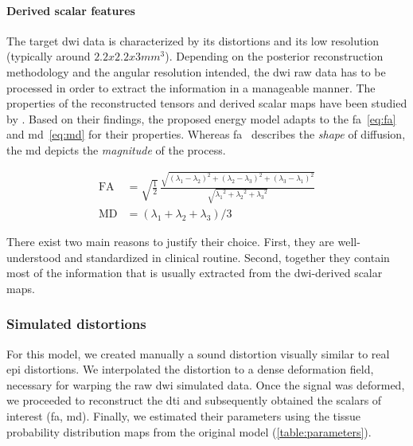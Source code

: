 \paragraph{Derived scalar features}
The target \ac{dwi} data is characterized by its distortions and its
low resolution (typically around $2.2x2.2x3mm^3$). Depending on the
posterior reconstruction methodology and the angular resolution
intended, the \ac{dwi} raw data has to be processed in order to
extract the information in a manageable manner. The properties of
the reconstructed tensors and derived scalar maps have been
studied by \cite{ennis_orthogonal_2006}. Based on their
findings, the proposed energy model adapts to the \ac{fa}~\eqref{eq:fa} 
and \ac{md}~\eqref{eq:md} for their properties. 
Whereas \ac{fa} \ describes the \emph{shape} of diffusion, 
the \ac{md} depicts the \emph{magnitude} of the process. 

\begin{align}
\mathrm{FA} &= \sqrt{ \frac{1}{2}}\,\frac{\sqrt{ (\lambda_1 - \lambda_2)^2 + (\lambda_2 - \lambda_3)^2 + (\lambda_3 - \lambda_1)^2}}{\sqrt{ {\lambda_1}^2 + {\lambda_2}^2 + {\lambda_3}^2}} \label{eq:fa} \\
\mathrm{MD} &= ( \lambda_1 + \lambda_2 + \lambda_3 ) / 3 \label{eq:md}
\end{align}

There exist two main reasons to justify their choice. 
First, they are well-understood and standardized in clinical routine.
Second, together they contain most of the information that is
usually extracted from the \ac{dwi}-derived scalar maps. \\

\subsubsection{Simulated distortions}

For this model, we created manually a sound distortion visually similar
to real \ac{epi} distortions. We interpolated the distortion to a 
dense deformation field, necessary for warping the raw \ac{dwi} simulated
data. Once the signal was deformed, we proceeded to reconstruct the
\ac{dti} and subsequently obtained the scalars of interest (\ac{fa}, \ac{md}).
Finally, we estimated their parameters using the tissue probability
distribution maps from the original model (\autoref{table:parameters}).

